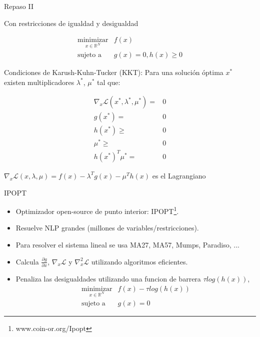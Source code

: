 \documentclass{beamer}
\begin{document}
\begin{frame}{Repaso II}

Con restricciones de igualdad y desigualdad

\begin{equation}
\begin{array}{cl}
\underset{x \in \mathbb{R}^N}{\text{minimizar}}  & \displaystyle f(x) \\
\text{sujeto a}
& g(x) = 0, h(x) \geq 0
\end{array}
\end{equation}

Condiciones de Karush-Kuhn-Tucker (KKT): Para una solución óptima $x^*$ existen multiplicadores $\lambda^*$, $\mu^*$ tal que:

\begin{equation}
\begin{array}{rl}
 \nabla_x \mathcal{L}(x^*, \lambda^*, \mu^*) =& 0  \\
 g(x^*) =& 0 \\
 h(x^*) \geq & 0 \\
 \mu^* \geq & 0 \\
 h(x^*)^T \mu^* =& 0
\end{array}
\end{equation}

$\nabla_x \mathcal{L}(x,\lambda,\mu) = f(x) - \lambda^T g(x) - \mu^T h(x)$ es el Lagrangiano 

\end{frame}

\begin{frame}{IPOPT}
    \begin{itemize}
    \item Optimizador open-source de punto interior: IPOPT\footnote{www.coin-or.org/Ipopt}.
    \item Resuelve NLP grandes (millones de variables/restricciones).
    \item Para resolver el sistema lineal se usa MA27, MA57, Mumps, Paradiso, ...
    \item Calcula $\frac{\partial g}{\partial x}$, $\nabla_x \mathcal{L}$ y $\nabla_x^2 \mathcal{L}$ utilizando algoritmos eficientes.
    \item Penaliza las desigualdades utilizando una funcion de barrera $\tau log(h(x))$,
        \begin{equation}
        \begin{array}{cl}
        \underset{x \in \mathbb{R}^N}{\text{minimizar}}  & \displaystyle f(x) - \tau log(h(x)) \\
        \text{sujeto a} & g(x) = 0
        \end{array}
        \end{equation}
    \end{itemize}
\end{frame}
\end{document}
